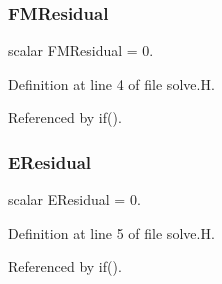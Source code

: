 \subsubsection{\texorpdfstring{F\+M\+Residual}{FMResidual}}
{\footnotesize\ttfamily scalar F\+M\+Residual = 0.}



Definition at line 4 of file solve.\+H.



Referenced by if().

\mbox{\label{solve_8H_a35af53331edb7c063348620f6e7d0819}} 
\subsubsection{\texorpdfstring{E\+Residual}{EResidual}}
{\footnotesize\ttfamily scalar E\+Residual = 0.}



Definition at line 5 of file solve.\+H.



Referenced by if().

